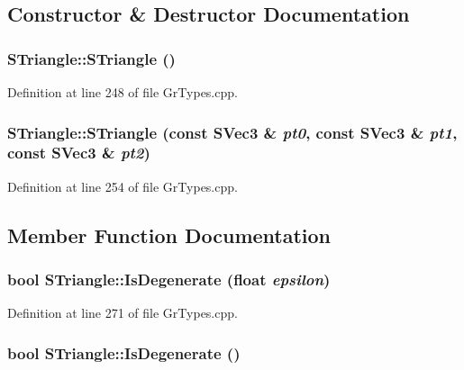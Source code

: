 \subsection{Constructor \& Destructor Documentation}
\hypertarget{struct_s_triangle_4a1f67c28ab4247e1cb17f0d9366c372}{
\subsubsection[{STriangle}]{\setlength{\rightskip}{0pt plus 5cm}STriangle::STriangle ()}}
\label{struct_s_triangle_4a1f67c28ab4247e1cb17f0d9366c372}




Definition at line 248 of file GrTypes.cpp.\hypertarget{struct_s_triangle_70c618fb4935e6cd2c96f4db3e7ca972}{
\subsubsection[{STriangle}]{\setlength{\rightskip}{0pt plus 5cm}STriangle::STriangle (const {\bf SVec3} \& {\em pt0}, \/  const {\bf SVec3} \& {\em pt1}, \/  const {\bf SVec3} \& {\em pt2})}}
\label{struct_s_triangle_70c618fb4935e6cd2c96f4db3e7ca972}




Definition at line 254 of file GrTypes.cpp.

\subsection{Member Function Documentation}
\hypertarget{struct_s_triangle_f1dfbe6d791c5ff702a586a14ec43764}{
\subsubsection[{IsDegenerate}]{\setlength{\rightskip}{0pt plus 5cm}bool STriangle::IsDegenerate (float {\em epsilon})}}
\label{struct_s_triangle_f1dfbe6d791c5ff702a586a14ec43764}




Definition at line 271 of file GrTypes.cpp.\hypertarget{struct_s_triangle_a6f228032366e82f1646488926ccc75e}{
\subsubsection[{IsDegenerate}]{\setlength{\rightskip}{0pt plus 5cm}bool STriangle::IsDegenerate ()}}
\label{struct_s_triangle_a6f228032366e82f1646488926ccc75e}




